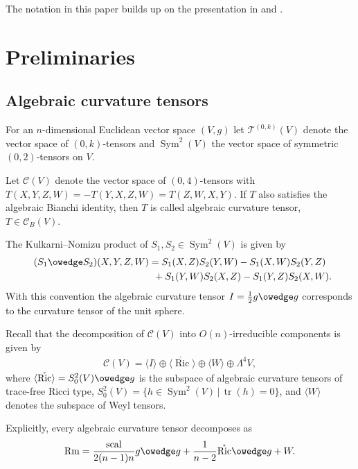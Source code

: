 \documentclass[10pt,a4paper]{amsart}
\numberwithin{equation}{section}
\newcommand{\Ric} {\operatorname{Ric}}
\newcommand{ \tr } {\operatorname{tr}}
\newcommand{\Rm} {\operatorname{Rm}}
\newcommand{\scal} {\operatorname{scal}}
\begin{document}
The notation in this paper builds up on the presentation in \cite[Chapter~9]{PetersenRiemGeom} and \cite{PetersenWinkBochner}.

\section{Preliminaries}

\subsection{Algebraic curvature tensors}
For an $n$-dimensional Euclidean vector space $(V,g)$ let $\mathcal{T}^{(0,k)}(V)$ denote the vector space of $(0,k)$-tensors and $\operatorname{Sym}^2(V)$ the vector space of symmetric $(0,2)$-tensors on $V$.

Let $\mathcal{C}(V)$ denote the vector space of $(0,4)$-tensors with $T(X,Y,Z,W) = - T(Y,X,Z,W) = T(Z,W,X,Y)$. If $T$ also satisfies the algebraic Bianchi identity, then $T$ is called algebraic curvature tensor, $T \in \mathcal{C}_B(V)$.

The Kulkarni--Nomizu product of $S_1, S_2 \in \operatorname{Sym}^2(V)$ is given by
\begin{gather*}
(S_1 \owedge S_2)(X,Y,Z,W) =   S_1(X,Z)S_2(Y,W)-S_1(X,W)S_2(Y,Z) \\
\hphantom{(S_1 \owedge S_2)(X,Y,Z,W) =}{}  +S_1(Y,W)S_2(X,Z)-S_1(Y,Z)S_2(X,W).
\end{gather*}
With this convention the algebraic curvature tensor $I= \frac{1}{2} g \owedge g$ corresponds to the curvature tensor of the unit sphere.

Recall that the decomposition of $\mathcal{C}(V)$ into $O(n)$-irreducible components is given by
\begin{gather*}
\mathcal{C}(V) = \langle I \rangle \oplus \langle \mathring{\Ric} \rangle \oplus \langle W \rangle \oplus \Lambda^4 V,
\end{gather*}
where $\langle \mathring{\Ric} \rangle = S_0^2(V) \owedge g$ is the subspace of algebraic curvature tensors of trace-free Ricci type, $S_0^2(V)= \big\lbrace h \in \operatorname{Sym}^2(V) \, \vert \, \tr(h)= 0 \big\rbrace$, and $\langle W \rangle$ denotes the subspace of Weyl tensors.

Explicitly, every algebraic curvature tensor decomposes as
\begin{gather*}
\Rm = \frac{\scal}{2(n-1)n} g \owedge g + \frac{1}{n-2} \mathring{\Ric} \owedge g + W.
\end{gather*}
\end{document}
